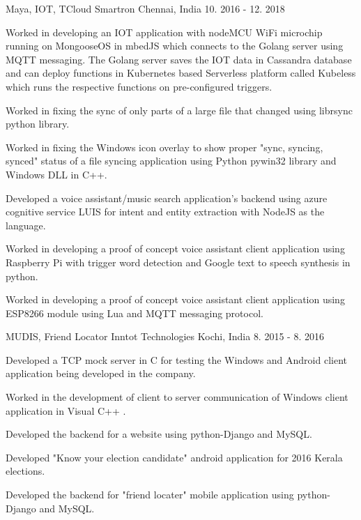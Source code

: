 \begin{cventries}
\cventry
{Maya, IOT, TCloud} %
{Smartron} %
{Chennai, India} %
{10. 2016 - 12. 2018} %
{ %
\begin{cvitems}
\item{Worked in developing an IOT application with nodeMCU WiFi microchip running on MongooseOS in mbedJS which connects to the Golang server using MQTT messaging. The Golang server saves the IOT data in Cassandra database and can deploy functions in Kubernetes based Serverless platform called Kubeless which runs the respective functions on pre-configured triggers.}
\item{Worked in fixing the sync of only parts of a large file that changed using librsync python library.}
\item{Worked in fixing the Windows icon overlay to show proper "sync, syncing, synced" status of a file syncing application using Python pywin32 library and Windows DLL in C++.}
\item{Developed a voice assistant/music search application's backend using azure cognitive service LUIS for intent and entity extraction with NodeJS as the language.}
\item{Worked in developing a proof of concept voice assistant client application using Raspberry Pi with trigger word detection and Google text to speech synthesis in python.}
\item{Worked in developing a proof of concept voice assistant client application using ESP8266 module using Lua and MQTT messaging protocol.}
\end{cvitems}
}


\cventry
{MUDIS, Friend Locator} %
{Inntot Technologies} %
{Kochi, India} %
{8. 2015 - 8. 2016} %
{ %
\begin{cvitems}
\item {Developed a TCP mock server in C for testing the Windows and Android client application being developed in the company.}
\item {Worked in the development of client to server communication of Windows client application in Visual C++ .}
\item{Developed the backend for a website using python-Django and MySQL.}
\item{Developed  "Know your election candidate" android application for 2016 Kerala elections.}
\item{Developed the backend for "friend locater" mobile application using python-Django and MySQL.}
\end{cvitems} 
}


\end{cventries}